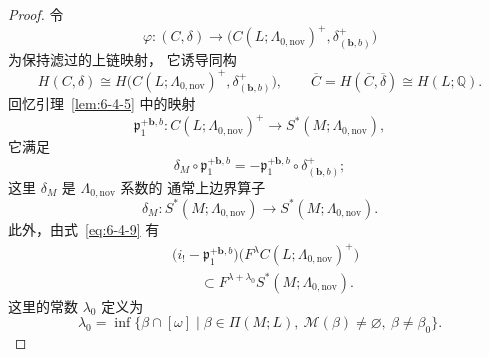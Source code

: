 \begin{proof}
令
\[
\varphi:(C,\delta)
\longrightarrow
\bigl(C(L;\Lambda_{0,\mathrm{nov}})^+,
\delta^+_{(\boldsymbol b,b)}\bigr)
\]
为保持滤过的上链映射，
它诱导同构
\[
H(C,\delta)
\cong
H\bigl(C(L;\Lambda_{0,\mathrm{nov}})^+,
\delta^+_{(\boldsymbol b,b)}\bigr),
\qquad
\overline C=H(\overline C,\overline\delta)
\cong H(L;\mathbb Q).
\]
回忆引理~\ref{lem:6-4-5} 中的映射
\[
\mathfrak p_1^{+\boldsymbol b,b}:
C(L;\Lambda_{0,\mathrm{nov}})^+
\longrightarrow
S^*(M;\Lambda_{0,\mathrm{nov}}),
\]
它满足
\[
\delta_M\circ\mathfrak p_1^{+\boldsymbol b,b}
=-\mathfrak p_1^{+\boldsymbol b,b}
\circ\delta^+_{(\boldsymbol b,b)};
\]
这里 $\delta_M$ 是
$\Lambda_{0,\mathrm{nov}}$ 系数的
通常上边界算子
\[
\delta_M:
S^*(M;\Lambda_{0,\mathrm{nov}})
\longrightarrow
S^*(M;\Lambda_{0,\mathrm{nov}}).
\]
此外，由式~\eqref{eq:6-4-9} 有
\begin{equation}
\begin{aligned}
&\bigl(i_!-\mathfrak p_1^{+\boldsymbol b,b}\bigr)
\bigl(F^\lambda C(L;\Lambda_{0,\mathrm{nov}})^+\bigr)\\
&\qquad\subset
F^{\lambda+\lambda_0}
S^*(M;\Lambda_{0,\mathrm{nov}}).
\end{aligned}
\tag{6.5.7}\label{eq:6-5-7}
\end{equation}
这里的常数 $\lambda_0$ 定义为
\[
\lambda_0=\inf
\{\beta\cap[\omega]\mid
\beta\in\Pi(M;L),\ 
\mathcal M(\beta)\ne\varnothing,
\ \beta\ne\beta_0\}.
\]


\end{proof}

